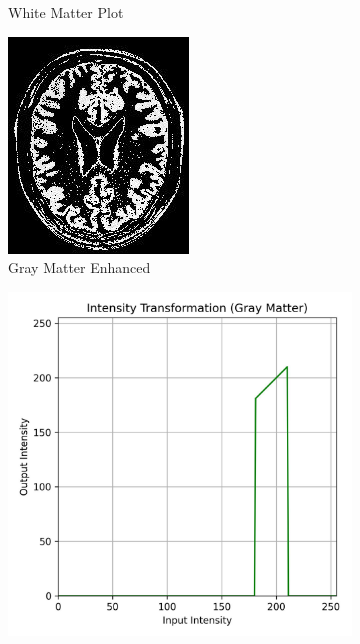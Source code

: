 \documentclass[11pt]{article}
\begin{document}
\begin{figure}[H]
\begin{subfigure}{0.26\textwidth}
        \caption{White Matter Plot}
    \end{subfigure}
    \hfill
    \begin{subfigure}{0.2\textwidth}
        \includegraphics[width=\textwidth]{resources/transformed_gray_matter.jpg}
        \caption{Gray Matter Enhanced}
    \end{subfigure}
    \hfill
    \begin{subfigure}{0.26\textwidth}
        \includegraphics[width=\textwidth]{resources/transformation_curve_gray_matter.jpg}

\end{subfigure}
\end{figure}
\end{document}
